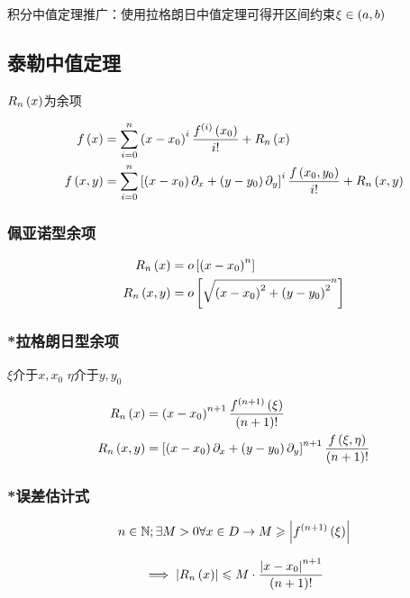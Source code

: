 \documentclass{article}
\begin{document}
积分中值定理推广：使用拉格朗日中值定理可得开区间约束$\xi\in\left(a,b\right)$

\subsection{泰勒中值定理}

$R_n\left(x\right)$为余项

\[\begin{aligned}
        f\left(x\right)   & =\sum_{i=0}^n\left(x-x_0\right)^i\frac{f^{\left(i\right)}\left(x_0\right)}{i!}+R_n\left(x\right)                                                   \\
        f\left(x,y\right) & =\sum_{i=0}^n\left[\left(x-x_0\right)\partial_x+\left(y-y_0\right)\partial_y\right]^i\frac{f\left(x_0,y_0\right)}{i!}+R_n\left(x,y\right)\label{2}
    \end{aligned}\]

\subsubsection{佩亚诺型余项}

\[\begin{aligned}
        R_n\left(x\right)   & =
        o\left[\left(x-x_0\right)^n\right] \\
        R_n\left(x,y\right) & =
        o\left[\sqrt{\left(x-x_0\right)^2+\left(y-y_0\right)^2}^n\right]
    \end{aligned}\]

\subsubsection{*拉格朗日型余项\label{Lagrange}}

$\xi$介于$x,x_0$
$\eta$介于$y,y_0$

\[\begin{aligned}
        R_n\left(x\right)   & =
        \left(x-x_0\right)^{n+1}\frac{f^{\left(n+1\right)}\left(\xi\right)}{\left(n+1\right)!} \\
        R_n\left(x,y\right) & =
        \left[\left(x-x_0\right)\partial_x+\left(y-y_0\right)\partial_y\right]^{n+1}\frac{f\left(\xi,\eta\right)}{\left(n+1\right)!}
    \end{aligned}\]

\subsubsection{*误差估计式}

\[n\in\mathbb N;\exists M>0\forall x\in D\to M\geqslant\left|f^{\left(n+1\right)}\left(\xi\right)\right|\]

\[\implies\left|R_n\left(x\right)\right|\leqslant M\cdot\frac{\left|x-x_0\right|^{n+1}}{\left(n+1\right)!}\]
\end{document}
